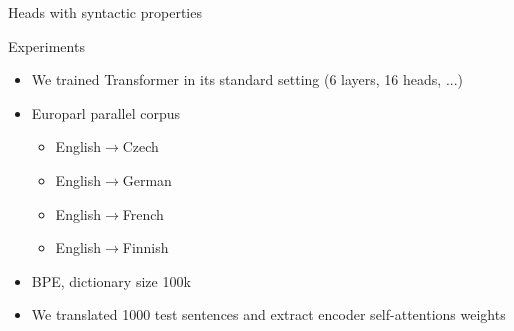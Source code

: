 \documentclass{beamer}
\begin{document}
\begin{frame}{Heads with syntactic properties}
\begin{center}
    \end{center}
\end{frame}

\begin{frame}{Experiments}
    \begin{itemize}
        \item We trained Transformer in its standard setting (6 layers, 16 heads, ...)
        \item Europarl parallel corpus
        \begin{itemize}
            \item English$\rightarrow$Czech
            \item English$\rightarrow$German
            \item English$\rightarrow$French
            \item English$\rightarrow$Finnish
        \end{itemize}
        \item BPE, dictionary size 100k
        \item We translated 1000 test sentences and extract encoder self-attentions weights
    \end{itemize}
\end{frame}
\end{document}
